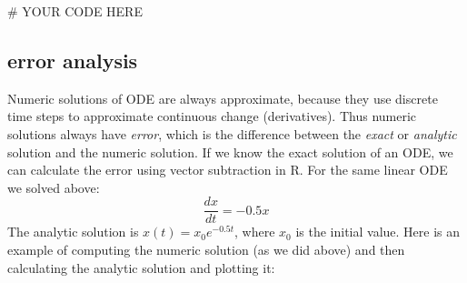 \documentclass[
  letterpaper,
  DIV=11,
  numbers=noendperiod]{scrreprt}
\newenvironment{Shaded}{\begin{snugshade}}{\end{snugshade}}
\newcommand{\CommentTok}[1]{\textcolor[rgb]{0.37,0.37,0.37}{#1}}
\begin{document}
\begin{Shaded}
\begin{Highlighting}[]
\CommentTok{\# YOUR CODE HERE}
\end{Highlighting}
\end{Shaded}

\hypertarget{error-analysis}{%
\subsection{error analysis}\label{error-analysis}}

Numeric solutions of ODE are always approximate, because they use
discrete time steps to approximate continuous change (derivatives). Thus
numeric solutions always have \emph{error}, which is the difference
between the \emph{exact} or \emph{analytic} solution and the numeric
solution. If we know the exact solution of an ODE, we can calculate the
error using vector subtraction in R. For the same linear ODE we solved
above: \[ 
\frac{dx}{dt} =  -0.5 x 
\] The analytic solution is \(x(t) = x_0 e^{-0.5t}\), where \(x_0\) is
the initial value. Here is an example of computing the numeric solution
(as we did above) and then calculating the analytic solution and
plotting it:
\end{document}

